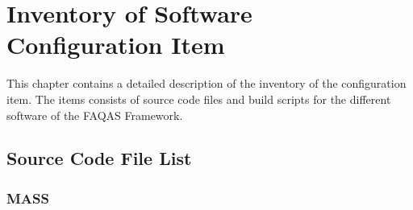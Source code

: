 
\chapter{Inventory of Software Configuration Item}

This chapter contains a detailed description of the inventory of the configuration item. The items consists of source code files and build scripts for the different software of the FAQAS Framework.

\section{Source Code File List}
\label{sec:code_list}

\subsection{MASS}

